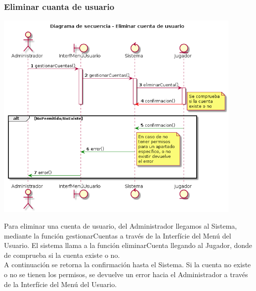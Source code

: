 \subsubsection{Eliminar cuanta de usuario}
\begin{center}
  \includegraphics[width=0.9\textwidth]{./imatges/administrador/Eliminar_cuenta_de_usuario.png}
  \end{center}
  Para eliminar una cuenta de usuario, del Administrador llegamos al Sistema, mediante la función gestionarCuentas a través de la Interfície del Menú del Usuario. El sistema llama a la función eliminarCuenta llegando al Jugador, donde de comprueba si la cuenta existe o no.
  \\A continuación se retorna la confirmación hasta el Sistema. Si la cuenta no existe o no se tienen los permisos, se devuelve un error hacia el Administrador a través de la Interfície del Menú del Usuario.
  
